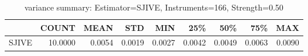 \begin{table}[ht]
\centering
\caption{variance summary: Estimator=SJIVE, Instruments=166, Strength=0.50}
\begin{tabular}{lrrrrrrrr}
\toprule
 & COUNT & MEAN & STD & MIN & 25\% & 50\% & 75\% & MAX \\
\midrule
SJIVE & 10.0000 & 0.0054 & 0.0019 & 0.0027 & 0.0042 & 0.0049 & 0.0063 & 0.0090 \\
\bottomrule
\end{tabular}
\end{table}
